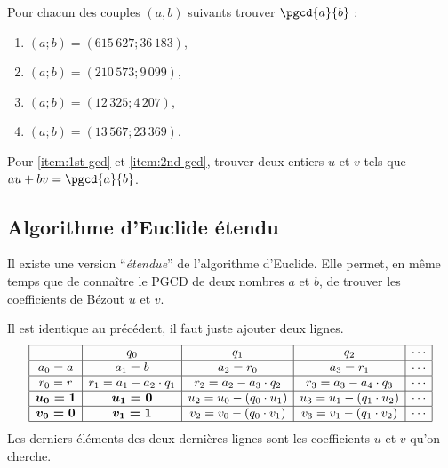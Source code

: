             \begin{exe}\label{exe:arith-7}
                  Pour chacun des couples $(a,b)$ suivants trouver $\pgcd{a}{b}$ :
                  \begin{enumerate}
                        \item $(a;b) = (615\,627 ; 36\,183)$, \label{item:1st gcd}
                        \item $(a;b) = (210\,573 ; 9\,099)$, \label{item:2nd gcd}
                        \item $(a;b) = (12\,325 ; 4\,207)$,
                        \item $(a;b) = (13\,567 ; 23\,369)$.
                  \end{enumerate}
                  Pour \ref{item:1st gcd} et \ref{item:2nd gcd}, trouver deux entiers $u$ et $v$ tels que
                  $au + bv = \pgcd{a}{b}$.
            \end{exe}
%
		\subsection*{Algorithme d'Euclide \'etendu}
		Il existe une version ``\emph{\'etendue}'' de l'algorithme d'Euclide.
		Elle permet, en m\^eme temps que de conna\^itre le PGCD de deux nombres $a$ et $b$, 
		de trouver les coefficients de B\'ezout $u$ et $v$.
		
		Il est identique au pr\'ec\'edent, il faut juste ajouter deux lignes.
		\[
			\begin{array}{|c|c|c|c|c|}
				\hline 
					& q_0 & q_1 & q_2 & \cdots \\ 
				\hline 
					a_0 = a & a_1 = b & a_2 = r_0 & a_3 = r_1  & \cdots \\ 
				\hline 
					r_0 = r & r_1 = a_1 - a_2 \cdot q_1 & r_2 = a_2 - a_3 \cdot q_2 & r_3 = a_3 - a_4 \cdot q_3 & \cdots \\ 
				\hline
					\boldsymbol{u_0 = 1} & \boldsymbol{u_1 = 0} & u_2 = u_0 - (q_0 \cdot u_1) & u_3 = u_1 - (q_1 \cdot u_2) & \cdots\\
				\hline
					\boldsymbol{v_0 = 0} & \boldsymbol{v_1 = 1} & v_2 = v_0 - (q_0 \cdot v_1) & v_3 = v_1 - (q_1 \cdot v_2) & \cdots\\
				\hline
			\end{array} 
		\]
		Les derniers \'el\'ements des deux derni\`eres lignes sont les coefficients $u$ et $v$ qu'on cherche.
		
